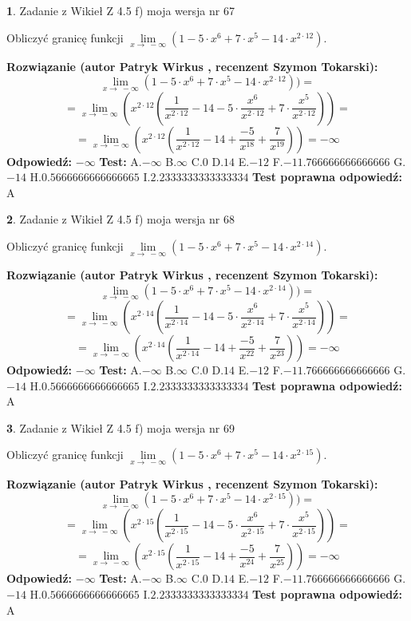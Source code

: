 \documentclass[12pt, a4paper]{article}
\theoremstyle{definition} %
\newtheorem{zad}{}
\newcommand{\zadStart}[1]{\begin{zad}#1\newline}
\newcommand{\zadStop}{\end{zad}}
\newcommand{\rozwStart}[2]{\noindent \textbf{Rozwiązanie (autor #1 , recenzent #2): }\newline}
\newcommand{\rozwStop}{\newline}
\newcommand{\odpStart}{\noindent \textbf{Odpowiedź:}\newline}
\newcommand{\odpStop}{\newline}
\newcommand{\testStart}{\noindent \textbf{Test:}\newline}
\newcommand{\testStop}{\newline}
\newcommand{\kluczStart}{\noindent \textbf{Test poprawna odpowiedź:}\newline}
\newcommand{\kluczStop}{\newline}
\begin{document}
\zadStart{Zadanie z Wikieł Z 4.5 f) moja wersja nr 67}


Obliczyć granicę funkcji  $\lim\limits_{x\to\ -\infty}(1 - 5 \cdot x^{6}+7 \cdot x^{5}- 14 \cdot x^{2\cdot12})$.
\zadStop
\rozwStart{Patryk Wirkus}{Szymon Tokarski}
$$\lim\limits_{x\to\ -\infty}(1 - 5 \cdot x^{6}+7 \cdot x^{5}- 14 \cdot x^{2\cdot12}))=$$
$$=\lim\limits_{x\to\ -\infty}(x^{2\cdot12}(\frac{1}{x^{2\cdot12}}-14 -5 \cdot \frac{x^{6}}{x^{2\cdot12}}+7 \cdot \frac{x^{5}}{x^{2\cdot12}}))=$$
$$=\lim\limits_{x\to\ -\infty}(x^{2\cdot12}(\frac{1}{x^{2\cdot12}}-14 + \frac{-5}{x^{18}}+ \frac{7}{x^{19}}))=-\infty$$
\rozwStop
\odpStart
$-\infty$
\odpStop
\testStart
A.$-\infty$ B.$\infty$ C.$0$ D.$14$ E.$-12$
F.$-11.766666666666666$ G.$-14$
H.$0.5666666666666665$
I.$2.2333333333333334$
\testStop
\kluczStart
A
\kluczStop



\zadStart{Zadanie z Wikieł Z 4.5 f) moja wersja nr 68}


Obliczyć granicę funkcji  $\lim\limits_{x\to\ -\infty}(1 - 5 \cdot x^{6}+7 \cdot x^{5}- 14 \cdot x^{2\cdot14})$.
\zadStop
\rozwStart{Patryk Wirkus}{Szymon Tokarski}
$$\lim\limits_{x\to\ -\infty}(1 - 5 \cdot x^{6}+7 \cdot x^{5}- 14 \cdot x^{2\cdot14}))=$$
$$=\lim\limits_{x\to\ -\infty}(x^{2\cdot14}(\frac{1}{x^{2\cdot14}}-14 -5 \cdot \frac{x^{6}}{x^{2\cdot14}}+7 \cdot \frac{x^{5}}{x^{2\cdot14}}))=$$
$$=\lim\limits_{x\to\ -\infty}(x^{2\cdot14}(\frac{1}{x^{2\cdot14}}-14 + \frac{-5}{x^{22}}+ \frac{7}{x^{23}}))=-\infty$$
\rozwStop
\odpStart
$-\infty$
\odpStop
\testStart
A.$-\infty$ B.$\infty$ C.$0$ D.$14$ E.$-12$
F.$-11.766666666666666$ G.$-14$
H.$0.5666666666666665$
I.$2.2333333333333334$
\testStop
\kluczStart
A
\kluczStop



\zadStart{Zadanie z Wikieł Z 4.5 f) moja wersja nr 69}


Obliczyć granicę funkcji  $\lim\limits_{x\to\ -\infty}(1 - 5 \cdot x^{6}+7 \cdot x^{5}- 14 \cdot x^{2\cdot15})$.
\zadStop
\rozwStart{Patryk Wirkus}{Szymon Tokarski}
$$\lim\limits_{x\to\ -\infty}(1 - 5 \cdot x^{6}+7 \cdot x^{5}- 14 \cdot x^{2\cdot15}))=$$
$$=\lim\limits_{x\to\ -\infty}(x^{2\cdot15}(\frac{1}{x^{2\cdot15}}-14 -5 \cdot \frac{x^{6}}{x^{2\cdot15}}+7 \cdot \frac{x^{5}}{x^{2\cdot15}}))=$$
$$=\lim\limits_{x\to\ -\infty}(x^{2\cdot15}(\frac{1}{x^{2\cdot15}}-14 + \frac{-5}{x^{24}}+ \frac{7}{x^{25}}))=-\infty$$
\rozwStop
\odpStart
$-\infty$
\odpStop
\testStart
A.$-\infty$ B.$\infty$ C.$0$ D.$14$ E.$-12$
F.$-11.766666666666666$ G.$-14$
H.$0.5666666666666665$
I.$2.2333333333333334$
\testStop
\kluczStart
A
\kluczStop
\end{document}
